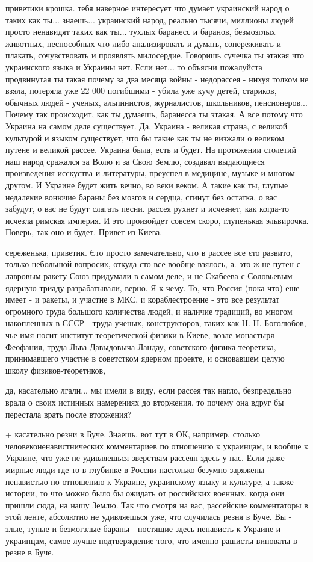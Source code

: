 приветики крошка. тебя наверное интересует что думает украинский народ о таких
как ты... знаешь... украинский народ, реально тысячи, миллионы людей просто
ненавидят таких как ты... тухлых баранесс и баранов, безмозглых животных,
неспособных что-либо анализировать и думать, сопереживать и плакать,
сочувствовать и проявлять милосердие. Говоришь сучечка ты этакая что
украинского языка и Украины нет. Если нет... то объясни пожалуйста продвинутая
ты такая почему за два месяца войны - недорассея - нихуя толком не взяла,
потеряла уже 22 000 погибшими - убила уже кучу детей, стариков, обычных людей -
ученых, альпинистов, журналистов, школьников, пенсионеров... Почему так
происходит, как ты думаешь, баранесса ты этакая. А все потому что Украина на
самом деле существует. Да, Украина - великая страна, с великой культурой и
языком существует, что бы такие как ты не визжали о великом путене и великой
рассее. Украина была, есть и будет. На протяжении столетий наш народ сражался
за Волю и за Свою Землю, создавал выдающиеся произведения исскуства и
литературы, преуспел в медицине, музыке и многом другом. И Украине будет жить
вечно, во веки веком. А такие как ты, глупые недалекие вонючие бараны без
мозгов и сердца, сгинут без остатка, о вас забудут, о вас не будут слагать
песни. рассея рухнет и исчезнет, как когда-то исчезла римская империя. И это
произойдет совсем скоро, глупенькая эльвирочка. Поверь, так оно и будет. Привет
из Киева.

сереженька, приветик. Єто просто замечательно, что в рассее все єто 
развито, только небольшой вопросик, откуда єто все вообще взялось, а. 
это ж не путен с лавровым ракету Союз придумали в самом деле, и не 
Скабеева с Соловьевым ядерную триаду разрабатывали, верно. Я к чему. То,
 что Россия (пока что) еше имеет - и ракеты, и участие в МКС, и 
кораблестроение - это все результат огромного труда большого количества 
людей, и наличие традиций, во многом накопленных в СССР - труда ученых, 
конструкторов, таких как Н. Н. Боголюбов, чье имя носит институт 
теоретической физики в Киеве, возле монастыря Феофания, труда Льва 
Давыдовыча Ландау, советского физика теоретика, принимавшего участие в 
советстком ядерном проекте, и основавшем целую школу физиков-теоретиков,

да, касательно лгали... мы имели в виду, если рассея так нагло, безпредельно
врала о своих истинных намерениях до вторжения, то почему она вдруг бы
перестала врать после вторжения?

+ касательно резни в Буче. Знаешь, вот тут в ОК, например, столько
человеконенавистнических комментариев по отношению к украинцам, и вообще к
Украине, что уже не удивляешься зверствам рассеян здесь у нас. Если даже мирные
люди где-то в глубинке в России настолько безумно заряжены ненавистью по
отношению к Украине, украинскому языку и культуре, а также истории, то что
можно было бы ожидать от российских военных, когда они пришли сюда, на нашу
Землю. Так что смотря на вас, рассейские комментаторы в этой ленте, абсолютно
не удивляешься уже, что случилась резня в Буче. Вы - злые, тупые и безмогзлые
бараны - постящие здесь ненависть к Украине и украинцам, самое лучше
подтверждение того, что именно рашисты виноваты в резне в Буче.


